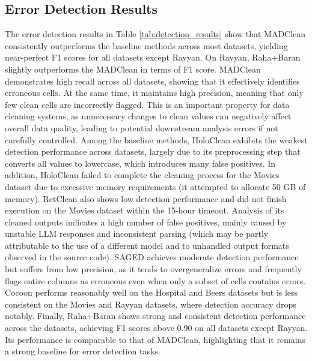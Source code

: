 \subsection{Error Detection Results}
The error detection results in Table \ref{tab:detection_results} show that MADClean consistently outperforms the baseline methods across most datasets, yielding near-perfect F1 scores for all datasets except Rayyan.
On Rayyan, Raha+Baran slightly outperforms the MADClean in terms of F1 score.
MADClean demonstrates high recall across all datasets, showing that it effectively identifies erroneous cells. 
At the same time, it maintains high precision, meaning that only few clean cells are incorrectly flagged. 
This is an important property for data cleaning systems, as unnecessary changes to clean values can negatively affect overall data quality, leading to potential downstream analysis errors if not carefully controlled.
\newline\newline
Among the baseline methods, HoloClean exhibits the weakest detection performance across datasets, largely due to its preprocessing step that converts all values to lowercase, which introduces many false positives. 
In addition, HoloClean failed to complete the cleaning process for the Movies dataset due to excessive memory requirements (it attempted to allocate 50 GB of memory). 
RetClean also shows low detection performance and did not finish execution on the Movies dataset within the 15-hour timeout. 
Analysis of its cleaned outputs indicates a high number of false positives, mainly caused by unstable LLM responses and inconsistent parsing (which may be partly attributable to the use of a different model and to unhandled output formats observed in the source code). 
SAGED achieves moderate detection performance but suffers from low precision, as it tends to overgeneralize errors and frequently flags entire columns as erroneous even when only a subset of cells contains errors. 
Cocoon performs reasonably well on the Hospital and Beers datasets but is less consistent on the Movies and Rayyan datasets, where detection accuracy drops notably. 
Finally, Raha+Baran shows strong and consistent detection performance across the datasets, achieving F1 scores above 0.90 on all datasets except Rayyan. 
Its performance is comparable to that of MADClean, highlighting that it remains a strong baseline for error detection tasks.

